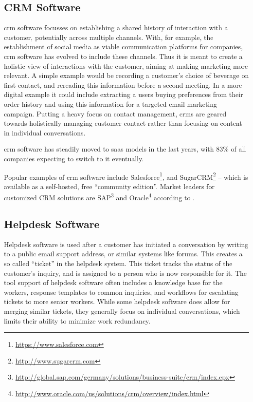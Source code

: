 \subsection{CRM Software}

\acrlong{crm} software focusses on establishing a shared history of interaction with a customer, potentially across multiple channels. With, for example, the establishment of social media as viable communication platforms for companies, \gls{crm} software has evolved to include these channels. Thus it is meant to create a holistic view of interactions with the customer, aiming at making marketing more relevant. A simple example would be recording a customer's choice of beverage on first contact, and rereading this information before a second meeting. In a more digital example it could include extracting a users buying preferences from their order history and using this information for a targeted email marketing campaign. Putting a heavy focus on contact management, \gls{crm}s are geared towards holistically managing customer contact rather than focusing on content in individual conversations.

\gls{crm} software has steadily moved to \gls{saas} models in the last years, with 83\% of all companies expecting to switch to it eventually.\citep{saasindustryreport}

Popular examples of \gls{crm} software include Salesforce\footnote{\url{https://www.salesforce.com}}, and SugarCRM\footnote{\url{http://www.sugarcrm.com}} -- which is available as a self-hosted, free ``community edition''. Market leaders for customized CRM solutions are SAP\footnote{\url{http://global.sap.com/germany/solutions/business-suite/crm/index.epx}} and Oracle\footnote{\url{http://www.oracle.com/us/solutions/crm/overview/index.html}} according to \citet{gartnercrm}.

\subsection{Helpdesk Software}

Helpdesk software is used after a customer has initiated a conversation by writing to a public email support address, or similar systems like forums. This creates a so called ``ticket'' in the helpdesk system. This ticket tracks the status of the customer's inquiry, and is  assigned to a person who is now responsible for it. The tool support of helpdesk software often includes a knowledge base for the workers, response templates to common inquiries, and workflows for escalating tickets to more senior workers. While some helpdesk software does allow for merging similar tickets, they generally focus on individual conversations, which limits their ability to minimize work redundancy.

